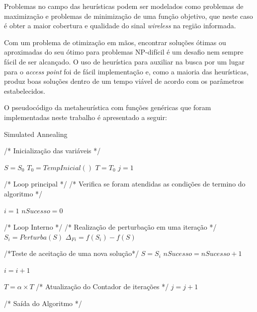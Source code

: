 \documentclass[
	12pt,				%
	twoside,			%
	a4paper,			%
	english,			%
	french,				%
	spanish,			%
	brazil				%
	]{abntex2}
\begin{document}
Problemas no campo das heurísticas podem ser modelados como problemas de
maximização e problemas de minimização de uma função objetivo, que neste
caso é obter a maior cobertura e qualidade do sinal \emph{wireless} na
região informada.

Com um problema de otimização em mãos, encontrar soluções ótimas ou
aproximadas do seu ótimo para problemas NP-difícil é um desafio nem
sempre fácil de ser alcançado. O uso de heurística para auxiliar na
busca por um lugar para o \emph{access point} foi de fácil implementação
e, como a maioria das heurísticas, produz boas soluções dentro de um
tempo viável de acordo com os parâmetros estabelecidos.

O pseudocódigo da metaheurística com funções genéricas que foram
implementadas neste trabalho é apresentado a seguir:

\begin{algorithm}
    \caption{Simulated Annealing}\label{sa}
    \begin{algorithmic}[1]
        
        \State/* Inicialização das variáveis */
        
        \State $S = S_{0}$
        \State $T_{0} = TempInicial()$
        \State $T = T_{0}$
        \State $j = 1$
        
        \State /* Loop principal */
        \State /* Verifica se foram atendidas as condições de termino do algoritmo */
        \Repeat
        
        \State $i = 1$
        \State $nSucesso = 0$
        
        \State /* Loop Interno */
        \State /* Realização de perturbação em uma iteração */
            \Repeat
                \State $S_{i} = Perturba(S)$
                \State $\Delta_{Fi} = f(S_{i}) - f(S)$
                
                \State /*Teste de aceitação de uma nova solução*/
                    \State $S = S_{i}$
                    \State $nSucesso = nSucesso + 1$
                \EndIf
            
            \State $i = i + 1$
        
           \State $T = \alpha \times T$
           \State /* Atualização do Contador de iterações */
           \State $j = j + 1$
        
        
        \State /* Saída do Algoritmo */
        \State {}
        
        \EndProcedure
    \end{algorithmic}
\end{algorithm}
\end{document}
